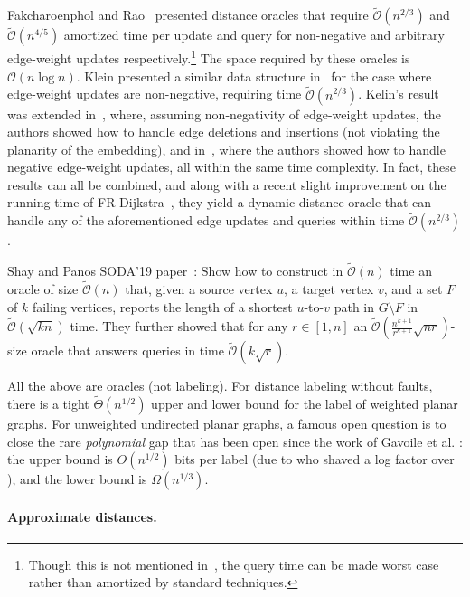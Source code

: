 \documentclass[11pt]{article}
\theoremstyle{plain}
\newcommand{\cO}{\mathcal{O}}
\newcommand{\cOtilde}{\tilde{\cO}}
\begin{document}
Fakcharoenphol and Rao~\cite{FR} presented distance oracles that require $\cOtilde(n^{2/3})$ and $\cOtilde(n^{4/5})$  amortized time per update and query for non-negative and arbitrary edge-weight updates respectively.\footnote{Though this is not mentioned in~\cite{FR}, the query time can be made worst case rather than amortized by standard techniques.} The space required by these oracles is $\cO(n \log n)$.
Klein presented a similar data structure in~\cite{MSSP} for the case where edge-weight updates are non-negative, requiring time $\cOtilde(n^{2/3} )$.
Kelin's result was extended in~\cite{DBLP:conf/stoc/ItalianoNSW11}, where, assuming non-negativity of edge-weight updates, the authors showed how to handle edge deletions and insertions (not violating the planarity of the embedding), and in~\cite{DBLP:journals/talg/KaplanMNS17}, where the authors showed how to handle negative edge-weight updates, all within the same time complexity.
In fact, these results can all be combined, and along with a recent slight improvement on the running time of FR-Dijkstra~\cite{DBLP:conf/icalp/GawrychowskiK18}, they yield a dynamic distance oracle that can handle any of the aforementioned edge updates and queries within time $\cOtilde(n^{2/3})$.

Shay and Panos SODA'19 paper~\cite{CharalampopoulosMozesTebeka}: Show how to construct in $\cOtilde(n)$ time an oracle of size $\cOtilde(n)$ that, given a source vertex $u$, a target vertex $v$, and a set $F$ of $k$ failing vertices, reports the length of a shortest $u$-to-$v$ path in $G \setminus F$ in  $\cOtilde(\sqrt{k n})$ time.  They further showed that for any $r \in [1,n]$ an $\cOtilde(\frac{n^{k+1}}{r^{k+1}} \sqrt{nr})$-size oracle that answers queries in time $\cOtilde(k\sqrt{r})$. 


All the above are oracles (not labeling). For distance labeling without faults, there is a tight $\tilde{\Theta}(n^{1/2})$ upper and lower bound for the label of weighted planar graphs. For unweighted undirected planar graphs, a famous open question is to close the rare \emph{polynomial} gap that has been open since the work of Gavoile et al. \cite{GPPR04}: the upper bound is $O(n^{1/2})$ bits per label (due to \cite{GawrychowskiU16} who shaved a log factor over \cite{GPPR04}), and the lower bound is $\Omega(n^{1/3})$.
 

\paragraph{Approximate distances.}
\end{document}
